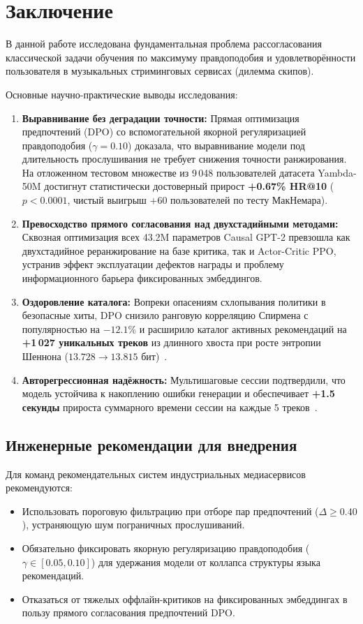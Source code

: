 \section{Заключение}
\label{sec:conclusion}

В данной работе исследована фундаментальная проблема рассогласования классической задачи обучения по максимуму правдоподобия и удовлетворённости пользователя в музыкальных стриминговых сервисах (дилемма скипов). 

Основные научно-практические выводы исследования:
\begin{enumerate}
    \item \textbf{Выравнивание без деградации точности:} Прямая оптимизация предпочтений (DPO) со вспомогательной якорной регуляризацией правдоподобия ($\gamma=0.10$) доказала, что выравнивание модели под длительность прослушивания не требует снижения точности ранжирования. На отложенном тестовом множестве из 9\,048 пользователей датасета Yambda-50M достигнут статистически достоверный прирост \textbf{+0.67\% HR@10} ($p < 0.0001$, чистый выигрыш $+60$ пользователей по тесту МакНемара).
    \item \textbf{Превосходство прямого согласования над двухстадийными методами:} Сквозная оптимизация всех 43.2M параметров Causal GPT-2 превзошла как двухстадийное реранжирование на базе критика, так и Actor-Critic PPO, устранив эффект эксплуатации дефектов награды и проблему информационного барьера фиксированных эмбеддингов.
    \item \textbf{Оздоровление каталога:} Вопреки опасениям схлопывания политики в безопасные хиты, DPO снизило ранговую корреляцию Спирмена с популярностью на \textbf{$-12.1\%$} и расширило каталог активных рекомендаций на \textbf{+1\,027 уникальных треков} из длинного хвоста при росте энтропии Шеннона ($13.728 \to 13.815$ бит)~\cite{petrov2024aligning}.
    \item \textbf{Авторегрессионная надёжность:} Мультишаговые сессии подтвердили, что модель устойчива к накоплению ошибки генерации и обеспечивает \textbf{+1.5 секунды} прироста суммарного времени сессии на каждые 5 треков~\cite{volkov2026session}.
\end{enumerate}

\subsection{Инженерные рекомендации для внедрения}
Для команд рекомендательных систем индустриальных медиасервисов рекомендуются:
\begin{itemize}
    \item Использовать пороговую фильтрацию при отборе пар предпочтений ($\Delta \ge 0.40$), устраняющую шум пограничных прослушиваний.
    \item Обязательно фиксировать якорную регуляризацию правдоподобия ($\gamma \in [0.05, 0.10]$) для удержания модели от коллапса структуры языка рекомендаций.
    \item Отказаться от тяжелых оффлайн-критиков на фиксированных эмбеддингах в пользу прямого согласования предпочтений DPO.
\end{itemize}

